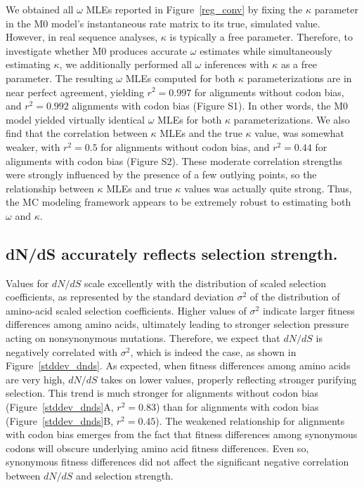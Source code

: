 \documentclass{pnastwo}
\begin{document}
\begin{article}
We obtained all $\omega$ MLEs reported in Figure~\ref{reg_conv} by fixing the $\kappa$ parameter in the M0 model's instantaneous rate matrix to its true, simulated value. However, in real sequence analyses, $\kappa$ is typically a free parameter. Therefore, to investigate whether M0 produces accurate $\omega$ estimates while simultaneously estimating $\kappa$, we additionally performed all $\omega$ inferences with $\kappa$ as a free parameter. The resulting $\omega$ MLEs computed for both $\kappa$ parameterizations are in near perfect agreement, yielding $r^2=0.997$ for alignments without codon bias, and $r^2=0.992$ alignments with codon bias (Figure S1). In other words, the M0 model yielded virtually identical $\omega$ MLEs for both $\kappa$ parameterizations. We also find that the correlation between $\kappa$ MLEs and the true $\kappa$ value, was somewhat weaker, with $r^2=0.5$ for alignments without codon bias, and $r^2=0.44$ for alignments with codon bias (Figure S2). These moderate correlation strengths were strongly influenced by the presence of a few outlying points, so the relationship between $\kappa$ MLEs and true $\kappa$ values was actually quite strong. Thus, the MC modeling framework appears to be extremely robust to estimating both $\omega$ and $\kappa$.  

\subsection*{dN/dS accurately reflects selection strength.}
Values for $dN/dS$ scale excellently with the distribution of scaled selection coefficients, as represented by the standard deviation $\sigma^2$ of the distribution of amino-acid scaled selection coefficients. Higher values of $\sigma^2$ indicate larger fitness differences among amino acids, ultimately leading to stronger selection pressure acting on nonsynonymous mutations. Therefore, we expect that $dN/dS$ is negatively correlated with $\sigma^2$, which is indeed the case, as shown in Figure~\ref{stddev_dnds}. As expected, when fitness differences among amino acids are very high, $dN/dS$ takes on lower values, properly reflecting stronger purifying selection. This trend is much stronger for alignments without codon bias (Figure~\ref{stddev_dnds}A, $r^2 = 0.83$) than for alignments with codon bias (Figure~\ref{stddev_dnds}B, $r^2 = 0.45$). The weakened relationship for alignments with codon bias emerges from the fact that fitness differences among synonymous codons will obscure underlying amino acid fitness differences. Even so, synonymous fitness differences did not affect the significant negative correlation between $dN/dS$ and selection strength.


\end{article}
\end{document}
